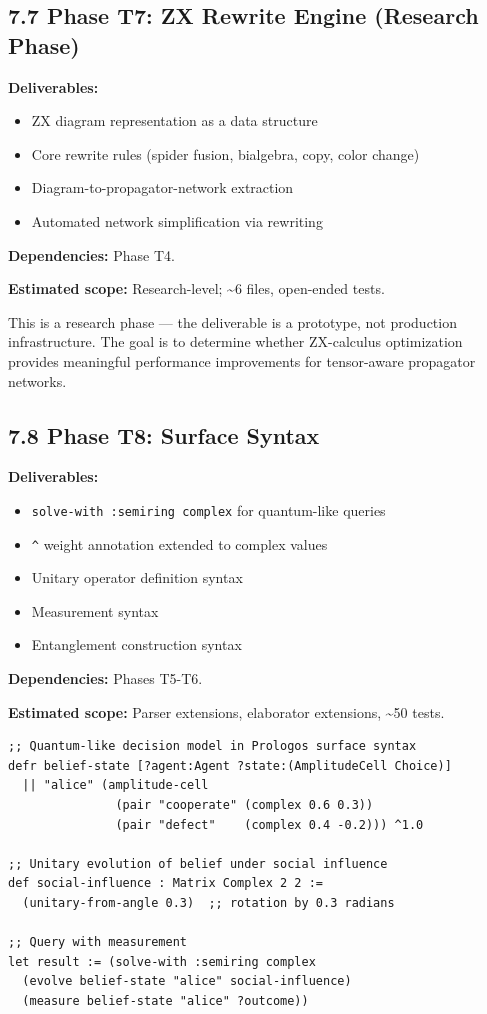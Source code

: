 \documentclass[11pt]{article}
\begin{document}
\subsection{7.7 Phase T7: ZX Rewrite Engine (Research Phase)}
\label{sec:org474c026}

\textbf{Deliverables:}
\begin{itemize}
\item ZX diagram representation as a data structure
\item Core rewrite rules (spider fusion, bialgebra, copy, color change)
\item Diagram-to-propagator-network extraction
\item Automated network simplification via rewriting
\end{itemize}

\textbf{Dependencies:} Phase T4.

\textbf{Estimated scope:} Research-level; \textasciitilde{}6 files, open-ended tests.

This is a research phase --- the deliverable is a prototype, not production
infrastructure. The goal is to determine whether ZX-calculus optimization
provides meaningful performance improvements for tensor-aware propagator
networks.
\subsection{7.8 Phase T8: Surface Syntax}
\label{sec:org5b4c114}

\textbf{Deliverables:}
\begin{itemize}
\item \texttt{solve-with :semiring complex} for quantum-like queries
\item \texttt{\textasciicircum{}} weight annotation extended to complex values
\item Unitary operator definition syntax
\item Measurement syntax
\item Entanglement construction syntax
\end{itemize}

\textbf{Dependencies:} Phases T5-T6.

\textbf{Estimated scope:} Parser extensions, elaborator extensions, \textasciitilde{}50 tests.

\begin{verbatim}
;; Quantum-like decision model in Prologos surface syntax
defr belief-state [?agent:Agent ?state:(AmplitudeCell Choice)]
  || "alice" (amplitude-cell
               (pair "cooperate" (complex 0.6 0.3))
               (pair "defect"    (complex 0.4 -0.2))) ^1.0

;; Unitary evolution of belief under social influence
def social-influence : Matrix Complex 2 2 :=
  (unitary-from-angle 0.3)  ;; rotation by 0.3 radians

;; Query with measurement
let result := (solve-with :semiring complex
  (evolve belief-state "alice" social-influence)
  (measure belief-state "alice" ?outcome))
\end{verbatim}
\end{document}
